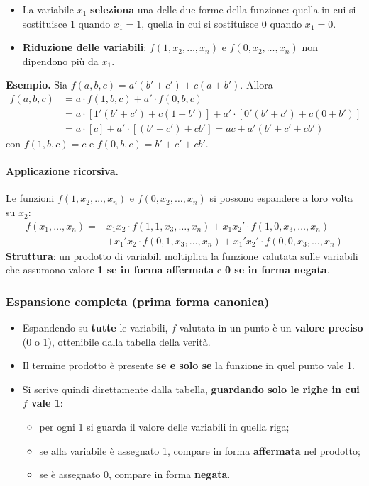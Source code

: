 \documentclass[12pt, a4paper]{article}
\begin{document}
\begin{itemize}
    \item La variabile $x_1$ \textbf{seleziona} una delle due forme della funzione: quella in cui si sostituisce 1 quando $x_1 = 1$, quella in cui si sostituisce 0 quando $x_1 = 0$.
    \item \textbf{Riduzione delle variabili}: $f(1, x_2, \dots, x_n)$ e $f(0, x_2, \dots, x_n)$ non dipendono più da $x_1$.
\end{itemize}

\textbf{Esempio.} Sia $f(a,b,c) = a'(b'+c') + c(a+b')$. Allora
\begin{align*}
f(a,b,c) &= a \cdot f(1,b,c) + a' \cdot f(0,b,c) \\
 &= a \cdot [1'(b'+c') + c(1+b')] + a' \cdot [0'(b'+c') + c(0+b')] \\
 &= a \cdot [c] + a' \cdot [(b'+c') + cb'] = ac + a'(b' + c' + cb')
\end{align*}
con $f(1,b,c) = c$ e $f(0,b,c) = b' + c' + cb'$.

\paragraph{Applicazione ricorsiva.} Le funzioni $f(1,x_2,\dots,x_n)$ e $f(0,x_2,\dots,x_n)$ si possono espandere a loro volta su $x_2$:
\begin{align*}
f(x_1,\dots,x_n) = {} & x_1x_2 \cdot f(1,1,x_3,\dots,x_n) + x_1x_2' \cdot f(1,0,x_3,\dots,x_n) \\
 & + x_1'x_2 \cdot f(0,1,x_3,\dots,x_n) + x_1'x_2' \cdot f(0,0,x_3,\dots,x_n)
\end{align*}
\textbf{Struttura}: un prodotto di variabili moltiplica la funzione valutata sulle variabili che assumono valore \textbf{1 se in forma affermata} e \textbf{0 se in forma negata}.

\subsubsection{Espansione completa (prima forma canonica)}
\begin{itemize}
    \item Espandendo su \textbf{tutte} le variabili, $f$ valutata in un punto è un \textbf{valore preciso} (0 o 1), ottenibile dalla tabella della verità.
    \item Il termine prodotto è presente \textbf{se e solo se} la funzione in quel punto vale 1.
    \item Si scrive quindi direttamente dalla tabella, \textbf{guardando solo le righe in cui $f$ vale 1}:
    \begin{itemize}
        \item per ogni 1 si guarda il valore delle variabili in quella riga;
        \item se alla variabile è assegnato 1, compare in forma \textbf{affermata} nel prodotto;
        \item se è assegnato 0, compare in forma \textbf{negata}.
    \end{itemize}
\end{itemize}
\end{document}
